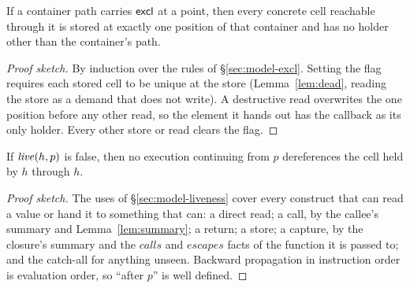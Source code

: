 \begin{lemma}
\label{lem:excl}
If a container path carries $\mathsf{excl}$ at a point, then every concrete cell reachable through it is stored
at exactly one position of that container and has no holder other than the container's path.
\end{lemma}
\begin{proof}[Proof sketch]
By induction over the rules of \S\ref{sec:model-excl}. Setting the flag requires each stored cell to be
unique at the store (Lemma~\ref{lem:dead}, reading the store as a demand that does not write). A
destructive read overwrites the one position before any other read, so the element it hands out has
the callback as its only holder. Every other store or read clears the flag.
\end{proof}

\begin{lemma}
\label{lem:live}
If $\mathit{live}(h, p)$ is false, then no execution continuing from $p$ dereferences the cell held by $h$
through $h$.
\end{lemma}
\begin{proof}[Proof sketch]
The uses of \S\ref{sec:model-liveness} cover every construct that can read a value or hand it to
something that can: a direct read; a call, by the callee's summary and Lemma~\ref{lem:summary}; a
return; a store; a capture, by the closure's summary and the $\mathit{calls}$ and $\mathit{escapes}$
facts of the function it is passed to; and the catch-all for anything unseen. Backward propagation in
instruction order is evaluation order, so ``after $p$'' is well defined.
\end{proof}

